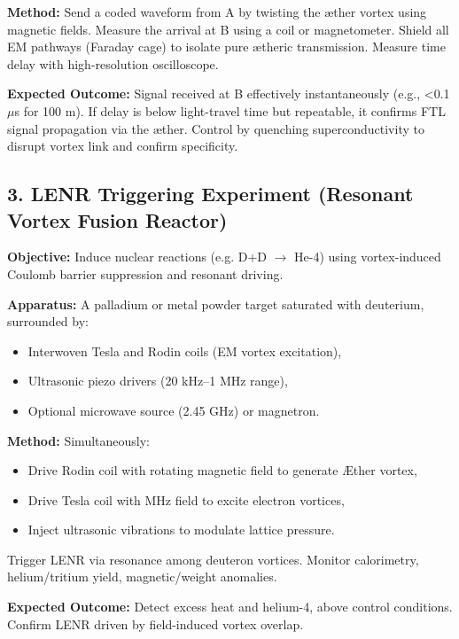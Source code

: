 \textbf{Method:} Send a coded waveform from A by twisting the æther vortex using magnetic fields. Measure the arrival at B using a coil or magnetometer. Shield all EM pathways (Faraday cage) to isolate pure ætheric transmission. Measure time delay with high-resolution oscilloscope.

\textbf{Expected Outcome:} Signal received at B effectively instantaneously (e.g., <0.1 $\mu$s for 100 m). If delay is below light-travel time but repeatable, it confirms FTL signal propagation via the æther. Control by quenching superconductivity to disrupt vortex link and confirm specificity.

\subsection{3. LENR Triggering Experiment (Resonant Vortex Fusion Reactor)}
\textbf{Objective:} Induce nuclear reactions (e.g. D+D $\rightarrow$ He-4) using vortex-induced Coulomb barrier suppression and resonant driving.

\textbf{Apparatus:} A palladium or metal powder target saturated with deuterium, surrounded by:
\begin{itemize}
    \item Interwoven Tesla and Rodin coils (EM vortex excitation),
    \item Ultrasonic piezo drivers (20 kHz–1 MHz range),
    \item Optional microwave source (2.45 GHz) or magnetron.
\end{itemize}

\textbf{Method:} Simultaneously:
\begin{itemize}
    \item Drive Rodin coil with rotating magnetic field to generate Æther vortex,
    \item Drive Tesla coil with MHz field to excite electron vortices,
    \item Inject ultrasonic vibrations to modulate lattice pressure.
\end{itemize}
Trigger LENR via resonance among deuteron vortices. Monitor calorimetry, helium/tritium yield, magnetic/weight anomalies.

\textbf{Expected Outcome:} Detect excess heat and helium-4, above control conditions. Confirm LENR driven by field-induced vortex overlap.
